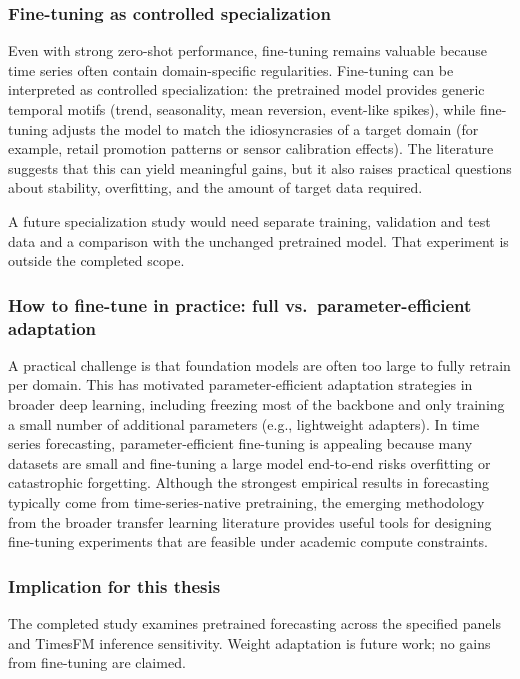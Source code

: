 \subsubsection{Fine-tuning as controlled specialization}
Even with strong zero-shot performance, fine-tuning remains valuable because time series often contain domain-specific regularities. Fine-tuning can be interpreted as controlled specialization: the pretrained model provides generic temporal motifs (trend, seasonality, mean reversion, event-like spikes), while fine-tuning adjusts the model to match the idiosyncrasies of a target domain (for example, retail promotion patterns or sensor calibration effects). The literature suggests that this can yield meaningful gains, but it also raises practical questions about stability, overfitting, and the amount of target data required.

A future specialization study would need separate training, validation and test data and a comparison with the unchanged pretrained model. That experiment is outside the completed scope.

\subsubsection{How to fine-tune in practice: full vs.\ parameter-efficient adaptation}
A practical challenge is that foundation models are often too large to fully retrain per domain. This has motivated parameter-efficient adaptation strategies in broader deep learning, including freezing most of the backbone and only training a small number of additional parameters (e.g., lightweight adapters). In time series forecasting, parameter-efficient fine-tuning is appealing because many datasets are small and fine-tuning a large model end-to-end risks overfitting or catastrophic forgetting. Although the strongest empirical results in forecasting typically come from time-series-native pretraining, the emerging methodology from the broader transfer learning literature provides useful tools for designing fine-tuning experiments that are feasible under academic compute constraints.

\subsubsection{Implication for this thesis}
The completed study examines pretrained forecasting across the specified panels and TimesFM inference sensitivity. Weight adaptation is future work; no gains from fine-tuning are claimed.

